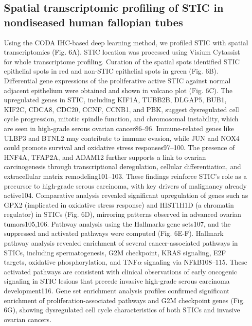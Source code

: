 \begin{refsection}
    \subsection{Spatial transcriptomic profiling of STIC in nondiseased human fallopian tubes}
    Using the CODA IHC-based deep learning method, we profiled STIC with spatial transcriptomics (Fig. 6A). STIC location was processed using Visium Cytassist for whole transcriptome profiling. Curation of the spatial spots identified STIC epithelial spots in red and non-STIC epithelial spots in green (Fig. 6B).
    Differential gene expressions of the proliferative active STIC against normal adjacent epithelium were obtained and shown in volcano plot (Fig. 6C). The upregulated genes in STIC, including KIF1A, TUBB2B, DLGAP5, BUB1, KIF2C, CDCA8, CDC20, CCNF, CCNB1, and PBK, suggest dysregulated cell cycle progression, mitotic spindle function, and chromosomal instability, which are seen in high-grade serous ovarian cancer86–96.  Immune-related genes like ULBP3 and BTNL2 may contribute to immune evasion, while JUN and NOX4 could promote survival and oxidative stress responses97–100. The presence of HNF4A, TFAP2A, and ADAM12 further supports a link to ovarian carcinogenesis through transcriptional deregulation, cellular differentiation, and extracellular matrix remodeling101–103. These findings reinforce STIC’s role as a precursor to high-grade serous carcinoma, with key drivers of malignancy already active104. Comparative analysis revealed significant upregulation of genes such as GPX2 (implicated in oxidative stress response) and HIST1H1D (a chromatin regulator) in STICs (Fig. 6D), mirroring patterns observed in advanced ovarian tumors105,106.
    Pathway analysis using the Hallmarks gene sets107, and the suppressed and activated pathways were computed (Fig. 6E-F). Hallmark pathway analysis revealed enrichment of several cancer-associated pathways in STICs, including spermatogenesis, G2M checkpoint, KRAS signaling, E2F targets, oxidative phosphorylation, and TNF$\alpha$ signaling via NFkB108–115. These activated pathways are consistent with clinical observations of early oncogenic signaling in STIC lesions that precede invasive high-grade serous carcinoma development116. Gene set enrichment analysis profiles confirmed significant enrichment of proliferation-associated pathways and G2M checkpoint genes (Fig. 6G), showing dysregulated cell cycle characteristics of both STICs and invasive ovarian cancers.

\end{refsection}
